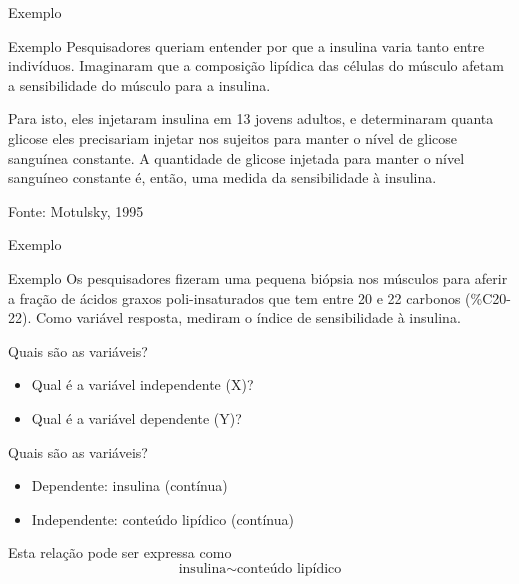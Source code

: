 \documentclass{beamer}
\begin{document}
\begin{frame}{\scriptsize Exemplo}
  \begin{exampleblock}{Exemplo}
    \scriptsize
   Pesquisadores queriam entender por que a insulina varia tanto entre
   indivíduos. Imaginaram que a \alert<2>{composição lipídica} das células do
   músculo afetam a \alert<3>{sensibilidade do músculo para a insulina}.

   \bigskip
   Para isto, eles injetaram insulina em 13 jovens adultos, e
   determinaram quanta glicose eles precisariam injetar nos sujeitos
   para manter o nível de glicose sanguínea constante. A quantidade de
   glicose injetada para manter o nível sanguíneo constante é, então,
   uma medida da sensibilidade à insulina.


   \bigskip
    {\hfill \tiny Fonte: Motulsky, 1995}
  \end{exampleblock}
\end{frame}

\begin{frame}{\scriptsize Exemplo}
  \begin{exampleblock}{Exemplo}
    \footnotesize
    Os pesquisadores fizeram uma pequena biópsia nos músculos para
    aferir a fração de ácidos graxos poli-insaturados que tem entre 20
    e 22 carbonos (\%C20-22). Como variável resposta, mediram o índice
    de sensibilidade à insulina.
  \end{exampleblock}
  \vfill
  \begin{block}{Quais são as variáveis?}
    \footnotesize
    \begin{itemize}
      \footnotesize
    \item Qual é a variável independente (X)? %
    \item Qual é a variável dependente (Y)? %
    \end{itemize}
  \end{block}
\end{frame}

\begin{frame}{\scriptsize Quais são as variáveis?}
  \begin{itemize}
    \footnotesize
  \item Dependente: insulina (contínua)
  \item Independente: conteúdo lipídico (contínua)
  \end{itemize}
  \vfill
  \begin{block}{Esta relação pode ser expressa como}
    \footnotesize
    \begin{displaymath}
      \text{insulina} \sim \text{conteúdo lipídico}
    \end{displaymath}
  \end{block}
\end{frame}
\end{document}
